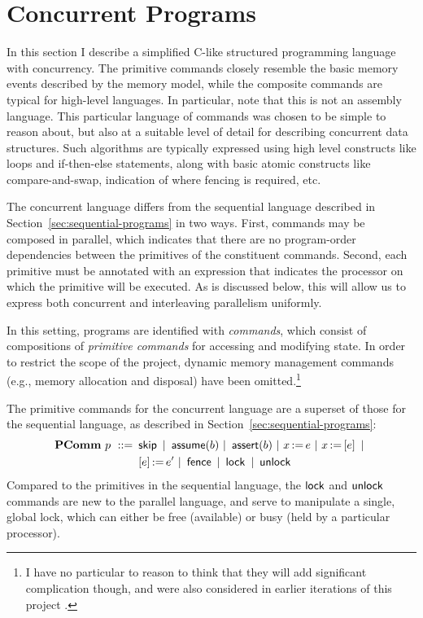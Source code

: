 \documentclass[11pt]{report}
\begin{document}
\section{Concurrent Programs}
\label{sec:programming-language}

In this section I describe a simplified C-like structured programming language with concurrency. The primitive commands closely resemble the basic memory events described by the memory model, while the composite commands are typical for high-level languages. In particular, note that this is not an assembly language. This particular language of commands was chosen to be simple to reason about, but also at a suitable level of detail for describing concurrent data structures. Such algorithms are typically expressed using high level constructs like loops and if-then-else statements, along with basic atomic constructs like compare-and-swap, indication of where fencing is required, etc. 

The concurrent language differs from the sequential language described in Section~\ref{sec:sequential-programs} in two ways. First, commands may be composed in parallel, which indicates that there are no program-order dependencies between the primitives of the constituent commands. Second, each primitive must be annotated with an expression that indicates the processor on which the primitive will be executed. As is discussed below, this will allow us to express both concurrent and interleaving parallelism uniformly.

In this setting, programs are identified with \emph{commands}, which consist of compositions of \emph{primitive commands} for accessing and modifying state. In order to restrict the scope of the project, dynamic memory management commands (e.g., memory allocation and disposal) have been omitted.\footnote{I have no particular to reason to think that they will add significant complication though, and were also considered in earlier iterations of this project \cite{wmsldetails,lola11}.}

The primitive commands for the concurrent language are a superset of those for the sequential language, as described in Section~\ref{sec:sequential-programs}: \begin{align*} \mathbf{PComm}~p ~::=~ & \operatorname{\mathsf{skip}} ~|~ \operatorname{\mathsf{assume}}(b) ~|~ \operatorname{\mathsf{assert}}(b) ~|~ x \operatorname{:\!=} e ~|~ x \operatorname{:\!=} \left[ e \right] ~|~ \\ 
	& \left[ e \right] \operatorname{:\!=} e' ~|~ \operatorname{\mathsf{fence}} ~|~ \operatorname{\mathsf{lock}} ~|~ \operatorname{\mathsf{unlock}} 	
\end{align*} Compared to the primitives in the sequential language, the $\operatorname{\mathsf{lock}}$ and $\operatorname{\mathsf{unlock}}$ commands are new to the parallel language, and serve to manipulate a single, global lock, which can either be free (available) or busy (held by a particular processor). 
\end{document}
